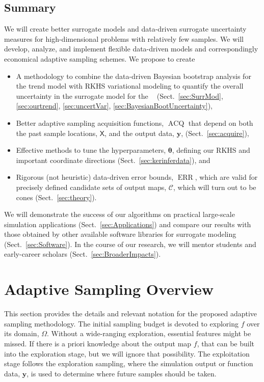 \documentclass[11pt]{NSFamsart}
\DeclareMathOperator{\QOI}{QOI} %
\DeclareMathOperator{\APP}{\widehat{\QOI}}
\DeclareMathOperator{\ERR}{ERR}
\DeclareMathOperator{\VAL}{ACQ}
\newcommand{\mX}{\mathsf{X}}
\newcommand{\by}{{\boldsymbol{y}}}
\newcommand{\btheta}{{\boldsymbol{\theta}}}
\newcommand{\calc}{{\mathcal{C}}}
\begin{document}
\subsection{Summary} 
We will create better surrogate models and data-driven surrogate uncertainty measures for high-dimensional problems with relatively few samples. We will develop, analyze, and implement flexible data-driven models and correspondingly economical adaptive sampling schemes. We propose to create
\begin{itemize}
\item A methodology to combine the data-driven Bayesian bootstrap analysis for the trend model with RKHS variational modeling to quantify the overall uncertainty in the surrogate model for the $\APP$ (Sect.\ \ref{sec:SurrMod}, \ref{sec:ourtrend},  \ref{sec:uncertVar}, \ref{sec:BayesianBootUncertainty}),
\item Better adaptive sampling acquisition functions, $\VAL$ that depend on both the past sample locations, $\mX$, and the output data, $\by$, (Sect.\ \ref{sec:acquire}),
\item Effective methods to tune the hyperparameters, $\btheta$, defining our RKHS and important coordinate directions (Sect.\ \ref{sec:kerinferdata}), and
\item Rigorous (not heuristic) data-driven error bounds, $\ERR$, which are valid for precisely defined candidate sets of output maps, $\calc$, which will turn out to be cones (Sect.\ \ref{sec:theory}).
\end{itemize}
We will demonstrate the success of our algorithms on practical large-scale simulation applications (Sect.\ \ref{sec:Applications}) and compare our results with those obtained by other available software libraries for surrogate modeling (Sect.\ \ref{sec:Software}). In the course of our research, we will mentor students and early-career scholars (Sect.\ \ref{sec:BroaderImpacts}). 

\section{Adaptive Sampling Overview} \label{sec:overview}
This section provides the details and relevant notation for the proposed adaptive sampling methodology. The initial sampling budget is devoted to exploring $f$ over its domain, $\Omega$. Without a wide-ranging exploration, essential features might be missed. If there is a priori knowledge about the output map $f$, that can be built into the exploration stage, but we will ignore that possibility. The exploitation stage follows the exploration sampling, where the simulation output or function data, $\by$, is used to determine where future samples should be taken.
\end{document}

